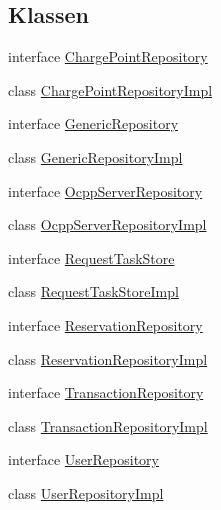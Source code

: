 \subsection*{Klassen}
\begin{DoxyCompactItemize}
\item 
interface \hyperlink{interfacede_1_1rwth_1_1idsg_1_1steve_1_1repository_1_1_charge_point_repository}{Charge\-Point\-Repository}
\item 
class \hyperlink{classde_1_1rwth_1_1idsg_1_1steve_1_1repository_1_1_charge_point_repository_impl}{Charge\-Point\-Repository\-Impl}
\item 
interface \hyperlink{interfacede_1_1rwth_1_1idsg_1_1steve_1_1repository_1_1_generic_repository}{Generic\-Repository}
\item 
class \hyperlink{classde_1_1rwth_1_1idsg_1_1steve_1_1repository_1_1_generic_repository_impl}{Generic\-Repository\-Impl}
\item 
interface \hyperlink{interfacede_1_1rwth_1_1idsg_1_1steve_1_1repository_1_1_ocpp_server_repository}{Ocpp\-Server\-Repository}
\item 
class \hyperlink{classde_1_1rwth_1_1idsg_1_1steve_1_1repository_1_1_ocpp_server_repository_impl}{Ocpp\-Server\-Repository\-Impl}
\item 
interface \hyperlink{interfacede_1_1rwth_1_1idsg_1_1steve_1_1repository_1_1_request_task_store}{Request\-Task\-Store}
\item 
class \hyperlink{classde_1_1rwth_1_1idsg_1_1steve_1_1repository_1_1_request_task_store_impl}{Request\-Task\-Store\-Impl}
\item 
interface \hyperlink{interfacede_1_1rwth_1_1idsg_1_1steve_1_1repository_1_1_reservation_repository}{Reservation\-Repository}
\item 
class \hyperlink{classde_1_1rwth_1_1idsg_1_1steve_1_1repository_1_1_reservation_repository_impl}{Reservation\-Repository\-Impl}
\item 
interface \hyperlink{interfacede_1_1rwth_1_1idsg_1_1steve_1_1repository_1_1_transaction_repository}{Transaction\-Repository}
\item 
class \hyperlink{classde_1_1rwth_1_1idsg_1_1steve_1_1repository_1_1_transaction_repository_impl}{Transaction\-Repository\-Impl}
\item 
interface \hyperlink{interfacede_1_1rwth_1_1idsg_1_1steve_1_1repository_1_1_user_repository}{User\-Repository}
\item 
class \hyperlink{classde_1_1rwth_1_1idsg_1_1steve_1_1repository_1_1_user_repository_impl}{User\-Repository\-Impl}
\end{DoxyCompactItemize}
